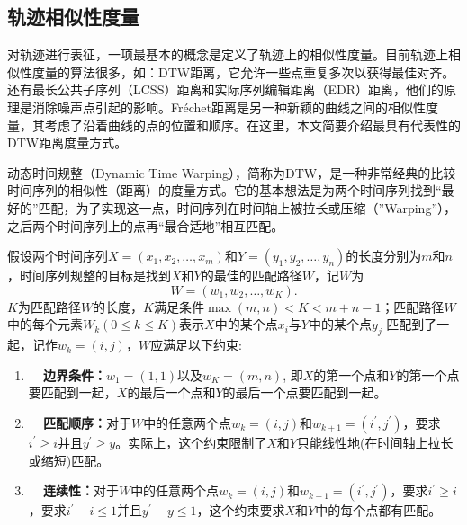 
\subsection{轨迹相似性度量}
对轨迹进行表征，一项最基本的概念是定义了轨迹上的相似性度量。目前轨迹上相似性度量的算法很多，如：DTW距离，它允许一些点重复多次以获得最佳对齐。还有最长公共子序列（LCSS）距离和实际序列编辑距离（EDR）距离，他们的原理是消除噪声点引起的影响。Fr\'echet距离是另一种新颖的曲线之间的相似性度量，其考虑了沿着曲线的点的位置和顺序。在这里，本文简要介绍最具有代表性的DTW距离度量方式。

动态时间规整（Dynamic Time Warping），简称为DTW，是一种非常经典的比较时间序列的相似性（距离）的度量方式。它的基本想法是为两个时间序列找到“最好的”匹配，为了实现这一点，时间序列在时间轴上被拉长或压缩（”Warping”），之后两个时间序列上的点再“最合适地”相互匹配。

假设两个时间序列$X = \left( x _ { 1 } , x _ { 2 } , \ldots , x _ { m } \right)$和$Y = \left( y _ { 1 } , y _ { 2 } , \ldots , y _ { n } \right)$的长度分别为$m$和$n$，时间序列规整的目标是找到$X$和$Y$的最佳的匹配路径$W$，记$W$为
\begin{equation}
W = \left( w _ { 1 } , w _ { 2 } , \ldots , w _ { K } \right).
\end{equation}
$K$为匹配路径$W$的长度，$K$满足条件$\max ( m , n ) < K < m + n - 1$；匹配路径$W$中的每个元素$W _ { k } ( 0 \leq k \leq K )$表示$X$中的某个点$x_i$与$Y$中的某个点$y_j$ 匹配到了一起，记作$w _ { k } = ( i , j )$，$W$应满足以下约束:

\begin{enumerate}
    \item \textbf{~~边界条件：}$w_1 = ( 1,1 )$以及$w _ { K } = ( m , n )$, 即$X$的第一个点和$Y$的第一个点要匹配到一起，$X$的最后一个点和$Y$的最后一个点要匹配到一起。
    \item \textbf{~~匹配顺序：}对于$W$中的任意两个点$w _ { k } = ( i , j )$和$w _ { k + 1 } = \left( i ^ { \prime } , j ^ { \prime } \right)$，要求$i ^ { \prime } \geq i$并且$y ^ { \prime } \geq y$。实际上，这个约束限制了$X$和$Y$只能线性地(在时间轴上拉长或缩短)匹配。
    \item \textbf{~~连续性：}对于$W$中的任意两个点$w _ { k } = ( i , j )$和$w _ { k + 1 } = \left( i ^ { \prime } , j ^ { \prime } \right)$，要求$i ^ { \prime } \geq i$，要求$i ^ { \prime } - i \leq 1$并且$y ^ { \prime } - y \leq 1$，这个约束要求$X$和$Y$中的每个点都有匹配。
\end{enumerate}

